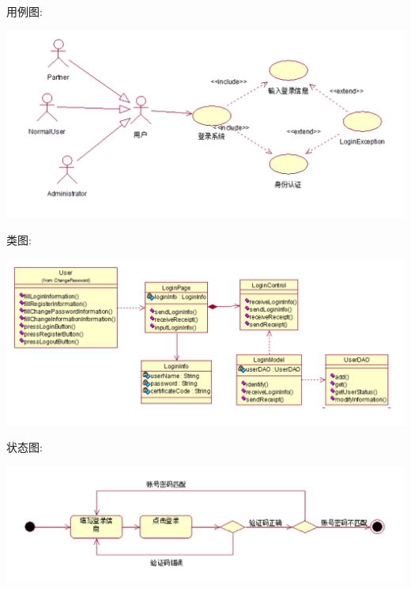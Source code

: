 \documentclass[11pt]{article}
\begin{document}
			用例图: 
			\begin{center}
			\includegraphics[scale=0.42]{登录_用例图.png}
			\end{center}

			类图: 
			\begin{center}
			\includegraphics[scale=0.42]{登录_类图.png}
			\end{center}

			状态图: 
			\begin{center}
			\includegraphics[scale=0.42]{登录_状态图.png}
			\end{center}
\end{document}
